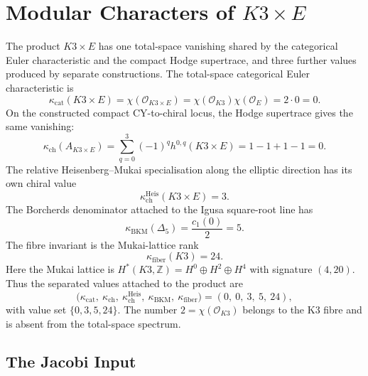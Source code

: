 \providecommand{\kBKM}{\kappa_{\mathrm{BKM}}}
\providecommand{\kch}{\kappa_{\mathrm{ch}}}
\providecommand{\kcat}{\kappa_{\mathrm{cat}}}
\providecommand{\kfib}{\kappa_{\mathrm{fiber}}}
\providecommand{\CY}{\mathrm{CY}}
\providecommand{\CoHA}{\mathrm{CoHA}}
\providecommand{\Zell}{Z_{\mathrm{ell}}}
\providecommand{\chitop}{\chi_{\mathrm{top}}}
\providecommand{\phizeroone}{\phi_{0,1}}
\providecommand{\Delfive}{\Delta_5}
\providecommand{\Dfive}{D_5}
\providecommand{\PhiTenUn}{\Phi_{10}^{\mathrm{un}}}
\providecommand{\PhiTenOP}{\Phi_{10}^{\mathrm{OP}}}
\providecommand{\Mtwofour}{M_{24}}
\providecommand{\SpCh}{\mathrm{SpCh}}
\providecommand{\PhiFA}{\Phi^{\mathrm{FA}}}

\section*{Modular Characters of \texorpdfstring{$K3\times E$}{K3 x E}}

The product $K3\times E$ has one total-space vanishing shared by the
categorical Euler characteristic and the compact Hodge supertrace, and
three further values produced by separate constructions.  The
total-space categorical Euler characteristic is
\[
  \kcat(K3\times E)
  = \chi(\mathcal O_{K3\times E})
  = \chi(\mathcal O_{K3})\chi(\mathcal O_E)
  = 2\cdot 0
  = 0.
\]
On the constructed compact CY-to-chiral locus, the Hodge supertrace gives
the same vanishing:
\[
  \kch(A_{K3\times E})
  = \sum_{q=0}^{3}(-1)^q h^{0,q}(K3\times E)
  = 1-1+1-1
  = 0.
\]
The relative Heisenberg--Mukai specialisation along the elliptic
direction has its own chiral value
\[
  \kch^{\mathrm{Heis}}(K3\times E)=3.
\]
The Borcherds denominator attached to the Igusa square-root line has
\[
  \kBKM(\Delfive)=\frac{c_1(0)}{2}=5.
\]
The fibre invariant is the Mukai-lattice rank
\[
  \kfib(K3)=24.
\]
Here the Mukai lattice is
$H^\ast(K3,\mathbb Z)=H^0\oplus H^2\oplus H^4$ with signature $(4,20)$.
Thus the separated values attached to the product are
\[
  \bigl(\kcat,\ \kch,\ \kch^{\mathrm{Heis}},\ \kBKM,\ \kfib\bigr)
  =
  (0,\ 0,\ 3,\ 5,\ 24),
\]
with value set $\{0,3,5,24\}$.  The number $2=\chi(\mathcal O_{K3})$
belongs to the K3 fibre and is absent from the total-space spectrum.

\subsection*{The Jacobi Input}

